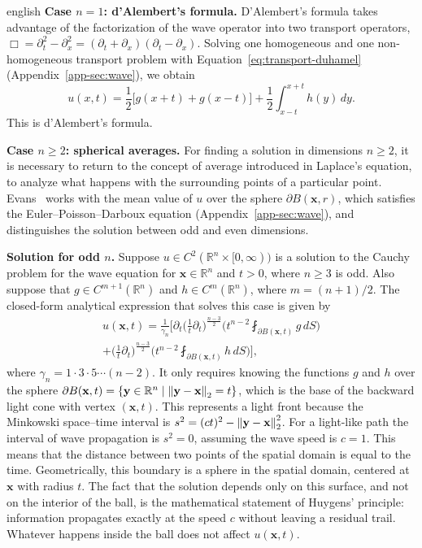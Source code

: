 \documentclass[0000.tex]{subfiles}
\begin{document}
\begin{hyphenrules}{english}
\textbf{Case $n=1$: d'Alembert's formula.}
D'Alembert's formula takes advantage of the factorization of the wave operator into two transport
operators, $\Box=\partial_t^2-\partial_x^2=(\partial_t+\partial_x)(\partial_t-\partial_x)$. Solving one
homogeneous and one non-homogeneous transport problem with Equation~\eqref{eq:transport-duhamel}
(Appendix~\ref{app-sec:wave}), we obtain
\begin{equation}
  u(x,t)=\frac12\big[g(x+t)+g(x-t)\big]+\frac12\int_{x-t}^{x+t}h(y)\,d y.
  \label{eq:dalembert}
\end{equation}
This is d'Alembert's formula.

\textbf{Case $n\ge2$: spherical averages.}
For finding a solution in dimensions $n\ge2$, it is necessary to return to the concept of average
introduced in Laplace's equation, to analyze what happens with the surrounding points of a particular
point. Evans~\cite{evans2010} works with the mean value of $u$ over the sphere $\partial B(\mathbf{x},r)$,
which satisfies the Euler--Poisson--Darboux equation (Appendix~\ref{app-sec:wave}), and distinguishes the
solution between odd and even dimensions.

\textbf{Solution for odd $n$.}
Suppose $u\in C^2(\mathbb{R}^n\times[0,\infty))$ is a solution to the Cauchy problem for the wave equation for
$\mathbf{x}\in\mathbb{R}^n$ and $t>0$, where $n\ge3$ is odd. Also suppose that $g\in C^{m+1}(\mathbb{R}^n)$ and
$h\in C^m(\mathbb{R}^n)$, where $m=(n+1)/2$. The closed-form analytical expression that solves this case is
given by \cite{evans2010}
\begin{multline}
  u(\mathbf{x},t)=\frac{1}{\gamma_n}\Bigg[\partial_t\Big(\frac1t\partial_t\Big)^{\frac{n-3}{2}}
    \Big(t^{n-2}\fint_{\partial B(\mathbf{x},t)}g\,d S\Big)\\
    +\Big(\frac1t\partial_t\Big)^{\frac{n-3}{2}}\Big(t^{n-2}\fint_{\partial B(\mathbf{x},t)}h\,d S\Big)\Bigg],
  \label{eq:wave-odd}
\end{multline}
where $\gamma_n=1\cdot3\cdot5\cdots(n-2)$. It only requires knowing the functions $g$ and $h$ over the
sphere $\partial B(\mathbf{x},t)=\{\mathbf{y}\in\mathbb{R}^n\mid\left\lVert \mathbf{y}-\mathbf{x} \right\rVert_2=t\}$, which is the base of the backward light
cone with vertex $(\mathbf{x},t)$. This represents a light front because the Minkowski space--time interval is
$s^2=(ct)^2-\left\lVert \mathbf{y}-\mathbf{x} \right\rVert_2^2$. For a light-like path the interval of wave propagation is $s^2=0$,
assuming the wave speed is $c=1$. This means that the distance between two points of the spatial domain
is equal to the time. Geometrically, this boundary is a sphere in the spatial domain, centered at $\mathbf{x}$
with radius $t$. The fact that the solution depends only on this surface, and not on the interior of
the ball, is the mathematical statement of Huygens' principle: information propagates exactly at the
speed $c$ without leaving a residual trail. Whatever happens inside the ball does not affect $u(\mathbf{x},t)$.


\end{hyphenrules}
\end{document}
